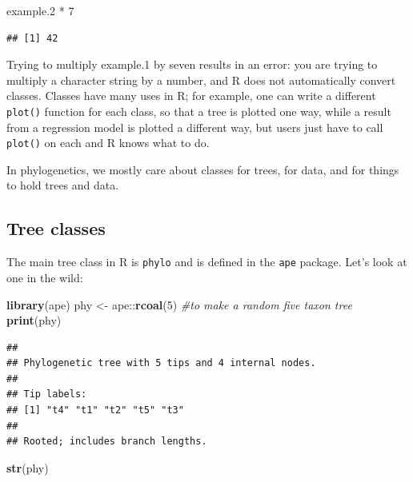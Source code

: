 \documentclass[]{book}
\newenvironment{Shaded}{\begin{snugshade}}{\end{snugshade}}
\newcommand{\KeywordTok}[1]{\textcolor[rgb]{0.13,0.29,0.53}{\textbf{{#1}}}}
\newcommand{\DecValTok}[1]{\textcolor[rgb]{0.00,0.00,0.81}{{#1}}}
\newcommand{\FloatTok}[1]{\textcolor[rgb]{0.00,0.00,0.81}{{#1}}}
\newcommand{\StringTok}[1]{\textcolor[rgb]{0.31,0.60,0.02}{{#1}}}
\newcommand{\CommentTok}[1]{\textcolor[rgb]{0.56,0.35,0.01}{\textit{{#1}}}}
\newcommand{\NormalTok}[1]{{#1}}
\theoremstyle{definition}
\theoremstyle{definition}
\theoremstyle{remark}
\begin{document}
\begin{Shaded}
\begin{Highlighting}[]
\NormalTok{example}\FloatTok{.2} \NormalTok{*}\StringTok{ }\DecValTok{7}
\end{Highlighting}
\end{Shaded}

\begin{verbatim}
## [1] 42
\end{verbatim}

Trying to multiply example.1 by seven results in an error: you are
trying to multiply a character string by a number, and R does not
automatically convert classes. Classes have many uses in R; for example,
one can write a different \texttt{plot()} function for each class, so
that a tree is plotted one way, while a result from a regression model
is plotted a different way, but users just have to call \texttt{plot()}
on each and R knows what to do.

In phylogenetics, we mostly care about classes for trees, for data, and
for things to hold trees and data.

\subsection{Tree classes}\label{tree-classes}

The main tree class in R is \texttt{phylo} and is defined in the
\texttt{ape} package. Let's look at one in the wild:

\begin{Shaded}
\begin{Highlighting}[]
\KeywordTok{library}\NormalTok{(ape)}
\NormalTok{phy <-}\StringTok{ }\NormalTok{ape::}\KeywordTok{rcoal}\NormalTok{(}\DecValTok{5}\NormalTok{) }\CommentTok{#to make a random five taxon tree}
\KeywordTok{print}\NormalTok{(phy)}
\end{Highlighting}
\end{Shaded}

\begin{verbatim}
## 
## Phylogenetic tree with 5 tips and 4 internal nodes.
## 
## Tip labels:
## [1] "t4" "t1" "t2" "t5" "t3"
## 
## Rooted; includes branch lengths.
\end{verbatim}

\begin{Shaded}
\begin{Highlighting}[]
\KeywordTok{str}\NormalTok{(phy)}
\end{Highlighting}
\end{Shaded}
\end{document}
